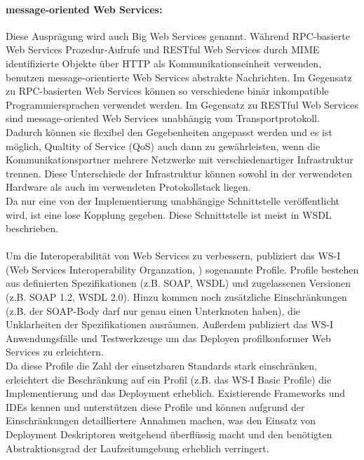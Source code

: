 \documentclass[runningheads]{llncs}
\newcommand{\germanquote}[1]{\glqq{}#1\grqq{}}
\begin{document}
    \paragraph{message-oriented Web Services:}
      Diese Ausprägung wird auch \germanquote{Big Web Services} genannt. Während RPC-basierte Web
      Services Prozedur-Aufrufe und RESTful Web Services durch MIME identifizierte Objekte über
      HTTP als Kommunikationseinheit verwenden, benutzen message-orientierte Web Services abstrakte
      Nachrichten. Im Gegensatz zu RPC-basierten Web Services können so verschiedene binär
      inkompatible Programmiersprachen verwendet werden. Im Gegensatz zu RESTful Web Services sind
      message-oriented Web Services unabhängig vom Transportprotokoll. Dadurch können sie flexibel
      den Gegebenheiten angepasst werden und es ist möglich, \germanquote{Qualtity of Service}
      (QoS) auch dann zu gewährleisten, wenn die Kommunikationspartner mehrere Netzwerke mit
      verschiedenartiger Infrastruktur trennen. Diese Unterschiede der Infrastruktur können sowohl
      in der verwendeten Hardware als auch im verwendeten Protokollstack liegen.\\
      Da nur eine von der Implementierung unabhängige Schnittstelle veröffentlicht wird, ist eine
      lose Kopplung gegeben. Diese Schnittstelle ist meist in WSDL beschrieben.

    \paragraph{}
    Um die Interoperabilität von Web Services zu verbessern, publiziert das WS-I (Web Services
    Interoperability Organzation, \cite{wsi_hp}) sogenannte Profile. Profile bestehen aus
    definierten Spezifikationen (z.B. SOAP, WSDL) und zugelassenen Versionen (z.B. SOAP 1.2, WSDL
    2.0). Hinzu kommen noch zusätzliche Einschränkungen (z.B. \germanquote{der SOAP-Body darf nur
    genau einen Unterknoten haben}), die Unklarheiten der Spezifikationen ausräumen. Außerdem
    publiziert das WS-I Anwendungsfälle und Testwerkzeuge um das Deployen profilkonformer Web
    Services zu erleichtern.\\
    Da diese Profile die Zahl der einsetzbaren Standards stark einschränken, erleichtert die
    Beschränkung auf ein Profil (z.B. das \germanquote{WS-I Basic Profile}) die Implementierung und
    das Deployment erheblich. Existierende Frameworks und IDEs kennen und unterstützen diese
    Profile und können aufgrund der Einschränkungen detailliertere Annahmen machen, was den Einsatz
    von Deployment Deskriptoren weitgehend überflüssig macht und den
    benötigten Abstraktionsgrad der Laufzeitumgebung erheblich verringert.
\end{document}
